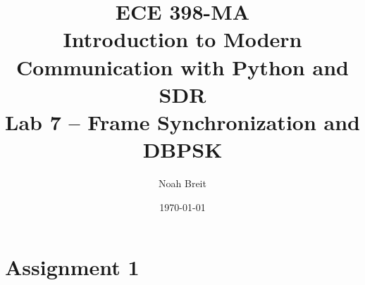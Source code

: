 \documentclass[
	letterpaper, %
	10pt, %
]{CSUniSchoolLabReport}
\title{ECE 398-MA \\ Introduction to Modern Communication with Python and SDR \\ Lab 7 -- Frame Synchronization and DBPSK} %
\author{Noah Breit} %
\date{\today} %
\begin{document}
\maketitle %




\section{Assignment 1}
\end{document}
